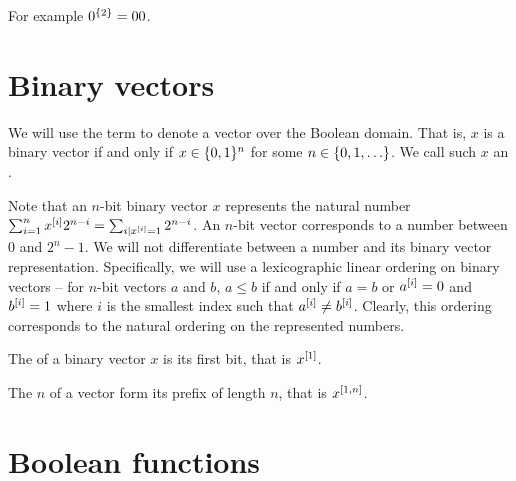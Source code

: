 For example
$0^{\{2\}} = 00$.

\section{Binary vectors}

\begin{definition}
We will use the term 
to denote a vector over the Boolean domain.
That is, $x$ is a binary vector if and only if
$x \in \{0, 1\}^n$ for some $n \in \{0, 1, \ldots\}$.
We call such $x$ an .
\end{definition}

Note that an $n$-bit binary vector $x$
represents the natural number
$\sum_{i = 1}^n x^{[i]} 2^{n-i}
= \sum_{i|x^{[i]}=1} 2^{n-i}$.
An $n$-bit vector
corresponds to a number between $0$ and $2^n - 1$.
We will not differentiate between a number
and its binary vector representation.
Specifically,
we will use a lexicographic linear ordering
on binary vectors --
for $n$-bit vectors $a$ and $b$,
$a \leq b$ if and only if $a = b$ or
$a^{[i]} = 0$ and $b^{[i]} = 1$
where $i$ is the smallest index such that
$a^{[i]} \neq b^{[i]}$.
Clearly,
this ordering corresponds to the natural ordering
on the represented numbers.

\begin{definition}
The  of a binary vector $x$
is its first bit,
that is $x^{[1]}$.

The $n$  of a vector
form its prefix of length $n$,
that is $x^{[1, n]}$.
\end{definition}

\section{Boolean functions}

